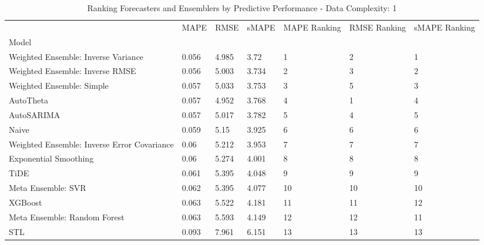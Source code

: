 \begin{table}
\caption{Ranking Forecasters and Ensemblers by Predictive Performance - Data Complexity: 1}
\begin{tabular}{lllllll}
\toprule
 & MAPE & RMSE & sMAPE & MAPE Ranking & RMSE Ranking & sMAPE Ranking \\
Model &  &  &  &  &  &  \\
\midrule
Weighted Ensemble: Inverse Variance & 0.056 & 4.985 & 3.72 & 1 & 2 & 1 \\
Weighted Ensemble: Inverse RMSE & 0.056 & 5.003 & 3.734 & 2 & 3 & 2 \\
Weighted Ensemble: Simple & 0.057 & 5.033 & 3.753 & 3 & 5 & 3 \\
AutoTheta & 0.057 & 4.952 & 3.768 & 4 & 1 & 4 \\
AutoSARIMA & 0.057 & 5.017 & 3.782 & 5 & 4 & 5 \\
Naive & 0.059 & 5.15 & 3.925 & 6 & 6 & 6 \\
Weighted Ensemble: Inverse Error Covariance & 0.06 & 5.212 & 3.953 & 7 & 7 & 7 \\
Exponential Smoothing & 0.06 & 5.274 & 4.001 & 8 & 8 & 8 \\
TiDE & 0.061 & 5.395 & 4.048 & 9 & 9 & 9 \\
Meta Ensemble: SVR & 0.062 & 5.395 & 4.077 & 10 & 10 & 10 \\
XGBoost & 0.063 & 5.522 & 4.181 & 11 & 11 & 12 \\
Meta Ensemble: Random Forest & 0.063 & 5.593 & 4.149 & 12 & 12 & 11 \\
STL & 0.093 & 7.961 & 6.151 & 13 & 13 & 13 \\
\bottomrule
\end{tabular}
\end{table}
